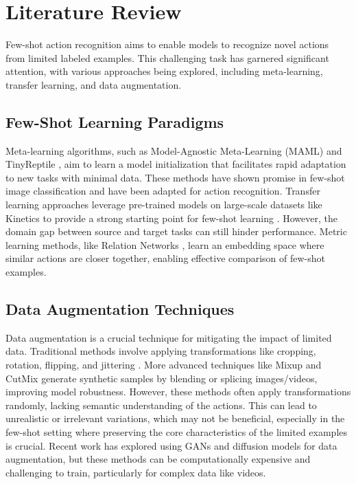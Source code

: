 \section{Literature Review}

Few-shot action recognition aims to enable models to recognize novel actions from limited labeled examples. This challenging task has garnered significant attention, with various approaches being explored, including meta-learning, transfer learning, and data augmentation.

\subsection{Few-Shot Learning Paradigms}

Meta-learning algorithms, such as Model-Agnostic Meta-Learning (MAML) \cite{finn2017model} and TinyReptile \cite{ren2023tinyreptile}, aim to learn a model initialization that facilitates rapid adaptation to new tasks with minimal data. These methods have shown promise in few-shot image classification \cite{chen2024few} and have been adapted for action recognition. Transfer learning approaches leverage pre-trained models on large-scale datasets like Kinetics \cite{kay2017kinetics} to provide a strong starting point for few-shot learning \cite{brown2020language}. However, the domain gap between source and target tasks can still hinder performance. Metric learning methods, like Relation Networks \cite{sung2018learning}, learn an embedding space where similar actions are closer together, enabling effective comparison of few-shot examples.

\subsection{Data Augmentation Techniques} 
Data augmentation is a crucial technique for mitigating the impact of limited data. Traditional methods involve applying transformations like cropping, rotation, flipping, and jittering \cite{cai2021jitter}. More advanced techniques like Mixup \cite{zhang2017mixup} and CutMix \cite{yun2019cutmix} generate synthetic samples by blending or splicing images/videos, improving model robustness. However, these methods often apply transformations randomly, lacking semantic understanding of the actions. This can lead to unrealistic or irrelevant variations, which may not be beneficial, especially in the few-shot setting where preserving the core characteristics of the limited examples is crucial. Recent work has explored using GANs \cite{goodfellow2014generative} and diffusion models \cite{chen2024overview} for data augmentation, but these methods can be computationally expensive and challenging to train, particularly for complex data like videos.

